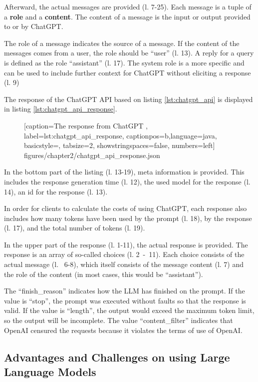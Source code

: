 Afterward, the actual messages are provided (l. 7-25). Each message is a tuple of a \textbf{role} and a \textbf{content}. The content of a message is the input or output provided to or by ChatGPT. 

The role of a message indicates the source of a message. If the content of the messages comes from a user, the role should be \enquote{user} (l. 13). A reply for a query is defined as the role \enquote{assistant} (l. 17). The system role is a more specific and can be used to include further context for ChatGPT without eliciting a response (l. 9)

The response of the ChatGPT \ac{API} based on listing \ref{lst:chatgpt_api} is displayed in listing \ref{lst:chatgpt_api_response}.
 \begin{figure} [htbp!]
			
			[caption={The response from ChatGPT  \cite{ChatGPT_url}},
			label={lst:chatgpt_api_response},
			captionpos=b,language=java, basicstyle=\footnotesize, tabsize=2, showstringspaces=false,  numbers=left]
			{figures/chapter2/chatgpt_api_response.json}
		\end{figure}

In the bottom part of the listing (l. 13-19), meta information is provided. This includes the response generation time (l. 12), the used model for the response (l. 14), an id for the response (l. 13).

In order for clients to calculate the costs of using ChatGPT, each response also includes how many tokens have been used by the prompt (l. 18), by the response (l. 17), and the total number of tokens (l. 19).

In the upper part of the response (l. 1-11), the actual response is provided. The response is an array of so-called choices (l. 2~-~11). Each choice consists of the actual message (l.~ 6-8), which itself consists of the message content (l. 7) and the role of the content (in most cases, this would be \enquote{assistant}).

The \enquote{finish\_reason} indicates how the \ac{LLM} has finished on the prompt. If the value is \enquote{stop}, the prompt was executed without faults so that the response is valid. If the value is \enquote{length}, the output would exceed the maximum token limit, so the output will be incomplete. The value \enquote{content\_filter} indicates that OpenAI censured the requests because it violates the terms of use of OpenAI. \cite{ChatGPT_url}


\subsection{Advantages and Challenges on using Large Language Models}\label{sec:llm_challenges}

